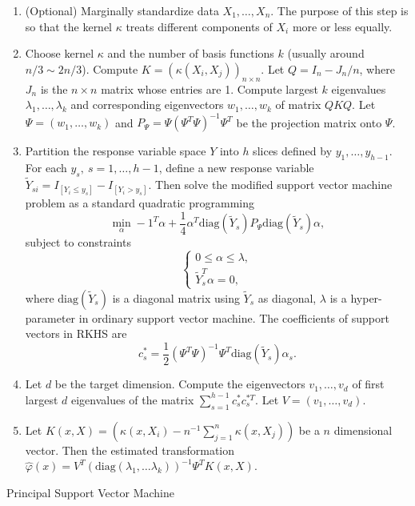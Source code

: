 \documentclass[oneside,english]{amsbook}
\numberwithin{section}{chapter}
\numberwithin{equation}{section}
\numberwithin{figure}{section}
\theoremstyle{plain}
\theoremstyle{plain}
\theoremstyle{definition}
\theoremstyle{plain}
\theoremstyle{plain}
\theoremstyle{remark}
\theoremstyle{definition}
\theoremstyle{definition}
\begin{document}
\begin{algorithm}
\begin{enumerate}
\item (Optional) Marginally standardize data $X_{1},\ldots,X_{n}$. The
purpose of this step is so that the kernel $\kappa$ treats different
components of $X_{i}$ more or less equally. 
\item Choose kernel $\kappa$ and the number of basis {{} } {functions
}$k$ (usually around $n/3\sim2n/3$). Compute $K=\left(\kappa\left(X_{i},X_{j}\right)\right)_{n\times n}$.
Let $Q=I_{n}-J_{n}/n$, where $J_{n}$ is the $n\times n$ matrix
whose entries are 1. Compute largest $k$ eigenvalues $\lambda_{1},\ldots,\lambda_{k}$
and corresponding eigenvectors $w_{1},\ldots,w_{k}$ of matrix $QKQ$.
Let $\Psi=\left(w_{1},\ldots,w_{k}\right)$ and $P_{\Psi}=\Psi\left(\Psi^{T}\Psi\right)^{-1}\Psi^{T}$
be the projection matrix onto $\Psi$.
\item \label{enu:svm}Partition the response variable space $Y$ into $h$
slices defined by $y_{1},\ldots,y_{h-1}$. For each $y_{s},\: s=1,\ldots,h-1$,
define a new response variable $\tilde{Y}_{si}=I_{\left[Y_{i}\le y_{s}\right]}-I_{\left[Y_{i}>y_{s}\right]}$.
Then solve the modified support vector machine problem as a standard
quadratic programming 
\[
\min_{\alpha}-1^{T}\alpha+\frac{1}{4}\alpha^{T}\mathrm{diag}\left(\tilde{Y}_{s}\right)P_{\Psi}\mathrm{diag}\left(\tilde{Y}_{s}\right)\alpha,
\]
subject to constraints
\[
\begin{cases}
0\le\alpha\le\lambda,\\
\tilde{Y}_{s}^{T}\alpha=0,
\end{cases}
\]
where $\mathrm{diag}\left(\tilde{Y}_{s}\right)$ is a diagonal matrix
using $\tilde{Y}_{s}$ as diagonal, $\lambda$ is a hyper-parameter
in ordinary support vector machine. The coefficients of support vectors
in RKHS {{} } {are} 
\[
c_{s}^{*}=\frac{1}{2}\left(\Psi^{T}\Psi\right)^{-1}\Psi^{T}\mathrm{diag}\left(\tilde{Y}_{s}\right)\alpha_{s}.
\]

\item \label{enu:pca}Let $d$ be the target dimension. Compute the eigenvectors
$v_{1},\ldots,v_{d}$ of first largest $d$ eigenvalues of the matrix
$\sum_{s=1}^{h-1}c_{s}^{*}c_{s}^{*T}$. Let $V=\left(v_{1},\ldots,v_{d}\right).$
\item Let $K\left(x,X\right)=\left(\kappa\left(x,X_{i}\right)-n^{-1}\sum_{j=1}^{n}\kappa\left(x,X_{j}\right)\right)$
be a $n$ dimensional vector. Then the estimated transformation $\hat{\varphi}\left(x\right)=V^{T}\left(\mathrm{diag}\left(\lambda_{1},\ldots\lambda_{k}\right)\right)^{-1}\Psi^{T}K\left(x,X\right).$
\end{enumerate}
\protect\caption{Principal Support Vector Machine\label{alg:Principal-Support-Vector}}
\end{algorithm}
\end{document}
